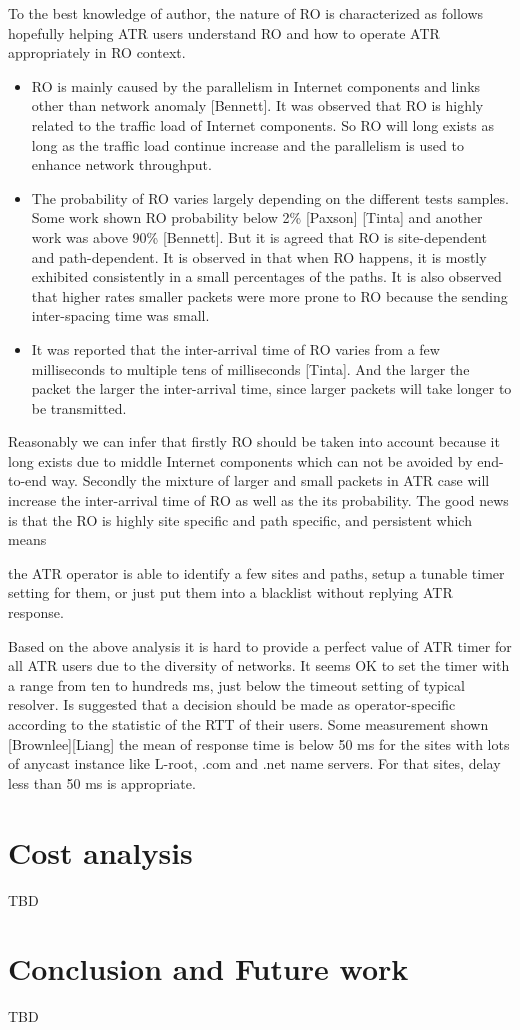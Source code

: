 To the best knowledge of author, the nature of RO is characterized as
follows hopefully helping ATR users understand RO and how to operate
ATR appropriately in RO context.

\begin{itemize}
  \item RO is mainly caused by the parallelism in Internet components and
   links other than network anomaly [Bennett].  It was observed that
   RO is highly related to the traffic load of Internet components.
   So RO will long exists as long as the traffic load continue
   increase and the parallelism is used to enhance network
   throughput.
  \item The probability of RO varies largely depending on the different
   tests samples.  Some work shown RO probability below 2\% [Paxson]
   [Tinta] and another work was above 90\% [Bennett].  But it is
   agreed that RO is site-dependent and path-dependent.  It is
   observed in that when RO happens, it is mostly exhibited
   consistently in a small percentages of the paths.  It is also
   observed that higher rates smaller packets were more prone to RO
   because the sending inter-spacing time was small.
  \item It was reported that the inter-arrival time of RO varies from a
   few milliseconds to multiple tens of milliseconds [Tinta].  And
   the larger the packet the larger the inter-arrival time, since
   larger packets will take longer to be transmitted.
\end{itemize}

Reasonably we can infer that firstly RO should be taken into account
because it long exists due to middle Internet components which can
not be avoided by end-to-end way.  Secondly the mixture of larger and
small packets in ATR case will increase the inter-arrival time of RO
as well as the its probability.  The good news is that the RO is
highly site specific and path specific, and persistent which means

the ATR operator is able to identify a few sites and paths, setup a
tunable timer setting for them, or just put them into a blacklist
without replying ATR response.

Based on the above analysis it is hard to provide a perfect value of
ATR timer for all ATR users due to the diversity of networks.  It
seems OK to set the timer with a range from ten to hundreds ms, just
below the timeout setting of typical resolver.  Is suggested that a
decision should be made as operator-specific according to the
statistic of the RTT of their users.  Some measurement shown
[Brownlee][Liang] the mean of response time is below 50 ms for the
sites with lots of anycast instance like L-root, .com and .net name
servers.  For that sites, delay less than 50 ms is appropriate.


\section{Cost analysis}
TBD
\section{Conclusion and Future work}
TBD
